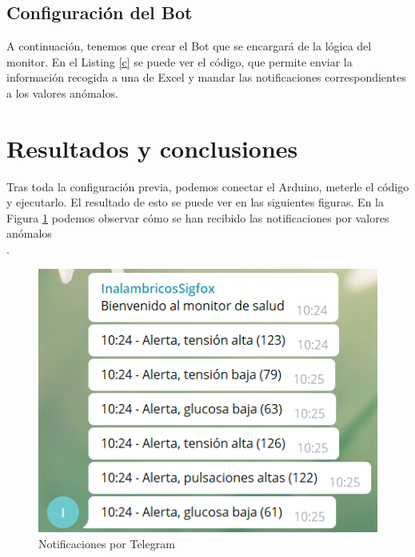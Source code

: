 \documentclass[12pt,a4paper]{article}
\begin{document}
\subsection{Configuración del Bot}

A continuación, tenemos que crear el Bot que se encargará de la lógica del monitor. En el Listing \ref{c} se puede ver el código, que permite enviar la información recogida a una de Excel y mandar las notificaciones correspondientes a los valores anómalos.\\

\newpage
\lstset{inputencoding=utf8/latin1}
  


\section{Resultados y conclusiones}

Tras toda la configuración previa, podemos conectar el Arduino, meterle el código y ejecutarlo. El resultado de esto se puede ver en las siguientes figuras. En la Figura \ref{d} podemos observar cómo se han recibido las notificaciones por valores anómalos\\.\nocite{ref2}

\begin{figure}[!h]
\begin{center}
\includegraphics[scale=1]{notificaciones.png}
\caption{Notificaciones por Telegram}
\label{d}
\end{center}
\end{figure}
\end{document}
